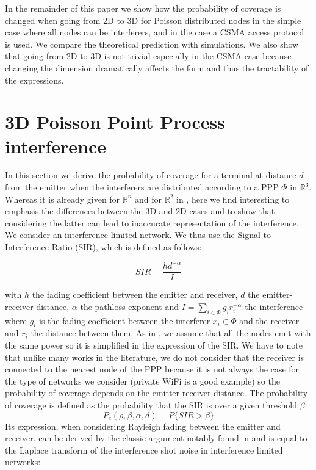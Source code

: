 \documentclass{sig-alternate-05-2015}
\begin{document}
In the remainder of this paper we show how the probability of coverage is changed when going from 2D to 3D for Poisson distributed nodes in the simple case where all nodes can be interferers, and in the case a CSMA access protocol is used. We compare the theoretical prediction with simulations. We also show that going from 2D to 3D is not trivial especially in the CSMA case because changing the dimension dramatically affects the form and thus the tractability of the expressions.

\section{3D Poisson Point Process interference}
\label{PPPsec}
In this section we derive the probability of coverage for a terminal at distance $d$ from the emitter when the interferers are distributed according to a PPP $\Phi$ in $\mathbb{R}^3$. Whereas it is already given for $\mathbb{R}^n$ and for $\mathbb{R}^2$ in \cite{baccelli09}, here we find interesting to emphasis the differences between the 3D and 2D cases and to show that considering the latter can lead to inaccurate representation of the interference.
We consider an interference limited network. We thus use the Signal to Interference Ratio (SIR), which is defined as follows:


\begin{equation}
 SIR=\frac{hd^{-\alpha}}{I}
 \label{sireq}
\end{equation}

with $h$ the fading coefficient between the emitter and receiver, $d$ the emitter-receiver distance, $\alpha$ the pathloss exponent and $I=\sum_{i\in \Phi}g_ir_i^{-\alpha}$ the interference where $g_i$ is the fading coefficient between the interferer $x_i \in \Phi$ and the receiver and $r_i$ the distance between them. As in \cite{nguyen07,hasan07}, we assume that all the nodes emit with the same power so it is simplified in the expression of the SIR. We have to note that unlike many works in the literature, we do not consider that the receiver is connected to the nearest node of the PPP because it is not always the case for the type of networks we consider (private WiFi is a good example) so the probability of coverage depends on the emitter-receiver distance. The probability of coverage is defined as the probability that the SIR is over a given threshold $\beta$:
\begin{equation}
 P_c(\rho,\beta,\alpha,d)\equiv P\{SIR>\beta\}
\end{equation}
Its expression, when considering Rayleigh fading between the emitter and receiver, can be derived by the classic argument notably found in \cite{baccelli09} and is equal to the Laplace transform of the interference shot noise in interference limited networks:
\end{document}
